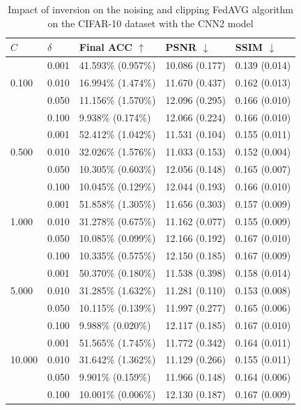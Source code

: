 \documentclass[conference,compsoc]{IEEEtran}
\begin{document}
\begin{table}[H]
\centering
\caption{Impact of inversion on the noising and clipping FedAVG algorithm on the CIFAR-10 dataset with the CNN2 model}
\label{table:dp_cifar10_cnn2}
\begin{tabular}{lllll}
\hline
$C$ & $\delta$ & \textbf{Final ACC} $\uparrow$ & \textbf{PSNR} $\downarrow$ & \textbf{SSIM} $\downarrow$ \\
\hline
\multirow{3}{*}{0.100} & 0.001 & 41.593\% (0.957\%) & 10.086 (0.177) & 0.139 (0.014) \\
& 0.010 & 16.994\% (1.474\%) & 11.670 (0.437) & 0.162 (0.013) \\
& 0.050 & 11.156\% (1.570\%) & 12.096 (0.295) & 0.166 (0.010) \\
& 0.100 & 9.938\% (0.174\%) & 12.066 (0.224) & 0.166 (0.010) \\
\hline
\multirow{3}{*}{0.500} & 0.001 & 52.412\% (1.042\%) & 11.531 (0.104) & 0.155 (0.011) \\
& 0.010 & 32.026\% (1.576\%) & 11.033 (0.153) & 0.152 (0.004) \\
& 0.050 & 10.305\% (0.603\%) & 12.056 (0.148) & 0.165 (0.007) \\
& 0.100 & 10.045\% (0.129\%) & 12.044 (0.193) & 0.166 (0.010) \\
\hline
\multirow{3}{*}{1.000} & 0.001 & 51.858\% (1.305\%) & 11.656 (0.303) & 0.157 (0.009) \\
& 0.010 & 31.278\% (0.675\%) & 11.162 (0.077) & 0.155 (0.009) \\
& 0.050 & 10.085\% (0.099\%) & 12.166 (0.192) & 0.167 (0.010) \\
& 0.100 & 10.335\% (0.575\%) & 12.150 (0.185) & 0.167 (0.009) \\
\hline
\multirow{3}{*}{5.000} & 0.001 & 50.370\% (0.180\%) & 11.538 (0.398) & 0.158 (0.014) \\
& 0.010 & 31.285\% (1.632\%) & 11.281 (0.110) & 0.153 (0.008) \\
& 0.050 & 10.115\% (0.139\%) & 11.997 (0.277) & 0.165 (0.006) \\
& 0.100 & 9.988\% (0.020\%) & 12.117 (0.185) & 0.167 (0.010) \\
\hline
\multirow{3}{*}{10.000} & 0.001 & 51.565\% (1.745\%) & 11.772 (0.342) & 0.164 (0.011) \\
& 0.010 & 31.642\% (1.362\%) & 11.129 (0.266) & 0.155 (0.011) \\
& 0.050 & 9.901\% (0.159\%) & 11.966 (0.148) & 0.164 (0.006) \\
& 0.100 & 10.001\% (0.006\%) & 12.130 (0.187) & 0.167 (0.009) \\
\hline
\end{tabular}
\end{table}
\end{document}
